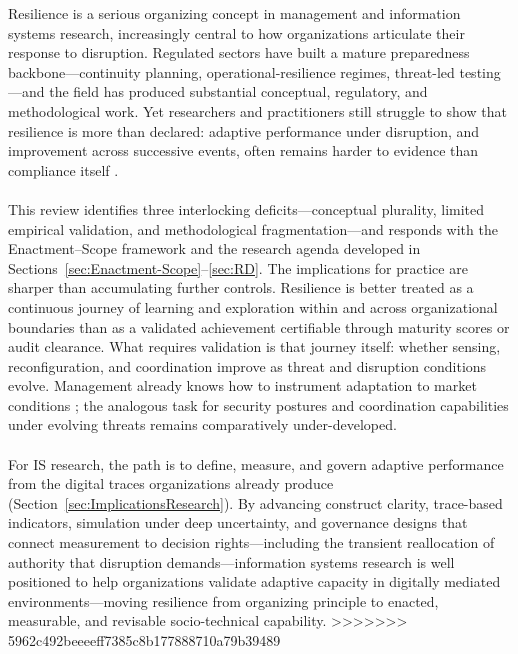 Resilience is a serious organizing concept in management and information systems research, increasingly central to how organizations articulate their response to disruption. Regulated sectors have built a mature preparedness backbone---continuity planning, operational-resilience regimes, threat-led testing---and the field has produced substantial conceptual, regulatory, and methodological work. Yet researchers and practitioners still struggle to show that resilience is more than declared: adaptive performance under disruption, and improvement across successive events, often remains harder to evidence than compliance itself \autocite{woods2015four,skopik2016problem,rota2024}.\\
\\
This review identifies three interlocking deficits---conceptual plurality, limited empirical validation, and methodological fragmentation---and responds with the Enactment--Scope framework and the research agenda developed in Sections~\ref{sec:Enactment-Scope}--\ref{sec:RD}. The implications for practice are sharper than accumulating further controls. Resilience is better treated as a continuous journey of learning and exploration within and across organizational boundaries than as a validated achievement certifiable through maturity scores or audit clearance. What requires validation is that journey itself: whether sensing, reconfiguration, and coordination improve as threat and disruption conditions evolve. Management already knows how to instrument adaptation to market conditions \autocite{teece2007explicating,duchek2019organizational}; the analogous task for security postures and coordination capabilities under evolving threats remains comparatively under-developed.\\
\\
For IS research, the path is to define, measure, and govern adaptive performance from the digital traces organizations already produce (Section~\ref{sec:ImplicationsResearch}). By advancing construct clarity, trace-based indicators, simulation under deep uncertainty, and governance designs that connect measurement to decision rights---including the transient reallocation of authority that disruption demands---information systems research is well positioned to help organizations validate adaptive capacity in digitally mediated environments---moving resilience from organizing principle to enacted, measurable, and revisable socio-technical capability.
>>>>>>> 5962c492beeeeff7385c8b177888710a79b39489
